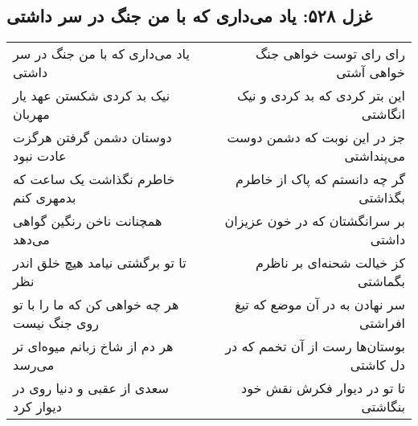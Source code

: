 \begin{center}
\section*{غزل ۵۲۸: یاد می‌داری که با من جنگ در سر داشتی}
\label{sec:528}
\begin{longtable}{l p{0.5cm} r}
یاد می‌داری که با من جنگ در سر داشتی
&&
رای رای توست خواهی جنگ خواهی آشتی
\\
نیک بد کردی شکستن عهد یار مهربان
&&
این بتر کردی که بد کردی و نیک انگاشتی
\\
دوستان دشمن گرفتن هرگزت عادت نبود
&&
جز در این نوبت که دشمن دوست می‌پنداشتی
\\
خاطرم نگذاشت یک ساعت که بدمهری کنم
&&
گر چه دانستم که پاک از خاطرم بگذاشتی
\\
همچنانت ناخن رنگین گواهی می‌دهد
&&
بر سرانگشتان که در خون عزیزان داشتی
\\
تا تو برگشتی نیامد هیچ خلق اندر نظر
&&
کز خیالت شحنه‌ای بر ناظرم بگماشتی
\\
هر چه خواهی کن که ما را با تو روی جنگ نیست
&&
سر نهادن به در آن موضع که تیغ افراشتی
\\
هر دم از شاخ زبانم میوه‌ای تر می‌رسد
&&
بوستان‌ها رست از آن تخمم که در دل کاشتی
\\
سعدی از عقبی و دنیا روی در دیوار کرد
&&
تا تو در دیوار فکرش نقش خود بنگاشتی
\\
\end{longtable}
\end{center}
